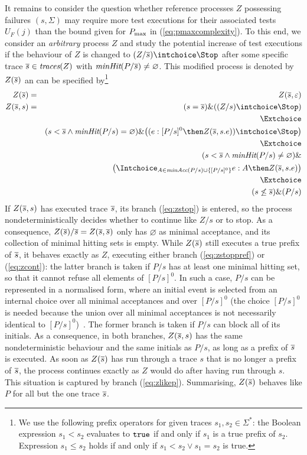 It remains to 
consider the question whether reference processes $Z$ possessing failures $(s,\Sigma)$
may require more test executions for their associated tests $U_F(j)$ than the bound
given for $P_\text{max}$ in (\ref{eq:pmaxcomplexity}). To this end, we consider an {\it arbitrary} process  $Z$ and study the potential increase of test executions if
the behaviour of $Z$ is changed to $(Z/\ol s)\intchoice \Stop$ after some specific 
trace $\overline s\in\text{\it traces}(Z)$ with $\text{\it minHit}(P/\overline s) \neq \varnothing$. This modified process is denoted by $Z({\overline s})$
an can be specified by\footnote{We use the following prefix operators
for given   traces $s_1,s_2\in\Sigma^*$: the Boolean 
expression $ s_1 < s_2$ evaluates to $\mbox{{\tt true}}$ if and only if $s_1$ is a true prefix of $s_2$. Expression $s_1\le s_2$ holds if and only if $ s_1 < s_2 \vee s_1 = s_2$ is true.}
\begin{eqnarray}
Z({\ol s}) & = & Z({\ol s},\varepsilon)
\\
\label{eq:zstop}
Z(\ol s,s) & = & (s = \ol s) \& ((Z/s)\intchoice \Stop)
\\ & & \Extchoice    \nonumber
\\  
\label{eq:zstoppref}
& & (s < \ol s \wedge \minhits(P/s) = \varnothing) \& 
\big(  (e:[P/s]^0 \then  Z(\ol s, s.e)) \intchoice \Stop \big)
\\ & & \Extchoice   \nonumber
\\ 
\label{eq:zcont}
& &           (s < \ol s\wedge \minhits(P/s) \neq \varnothing ) \& 
\\ & & \nonumber
\big(\Intchoice_{A\in\minaccs(P/s)\cup \{ [P/s]^0 \}}
e : A \then Z(\ol s, s.e)          \big)
\\ & & \Extchoice   \nonumber
\\
\label{eq:zlikep}
& & (s \not\le \ol s) \& (P/s)
\end{eqnarray}
%
If $Z(\overline s,s)$ has executed trace $\overline s$, its branch (\ref{eq:zstop}) is entered, 
so the process 
nondeterministically decides whether to continue like $Z/s$ or to stop. As a consequence,
$Z(\overline s)/\overline s = Z(\overline s,\overline s)$ only has $\varnothing$ as minimal acceptance, and its
  collection of minimal hitting sets is empty.
 While $Z(\overline s)$ still executes a true prefix
of $\overline s$, it behaves exactly as $Z$, executing either branch (\ref{eq:zstoppref}) or
(\ref{eq:zcont}): the latter branch is taken if $P/s$ has at least one minimal hitting set,
so that it cannot refuse all elements of $[P/s]^0$. In such a case, $P/s$ can be
represented in a normalised form, where an initial event is selected from an internal
choice over all minimal acceptances and over $[P/s]^0$ (the choice $[P/s]^0$ is needed
because the union over all minimal acceptances is not necessarily identical 
to $[P/s]^0$)~\cite[pp.~277]{Roscoe:1997:TPC:550448}. 
The former branch is taken if $P/s$ can block all of its initials.
As a consequence, in both branches, $Z(\overline s,s)$ 
has the same nondeterministic behaviour and the same initials as $P/s$, as long as
a prefix of $\overline s$ is executed. As soon as $Z(\overline s)$ has run through a trace $s$ that is no longer a prefix of $\overline s$, 
the process continues exactly as $Z$ would do after having run through $s$. This situation
is captured by branch (\ref{eq:zlikep}).
Summarising, $Z(\overline s)$ behaves like $P$ for all but the
one trace   $\overline s$.

